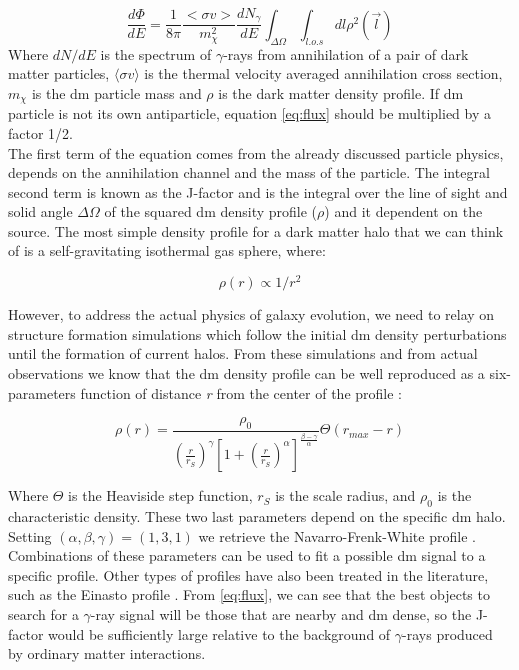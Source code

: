 \documentclass[main.tex]{subfiles}
\begin{document}
\begin{equation}
    \frac{d \Phi}{dE}=\frac{1}{8 \pi} \frac{<\sigma v>}{m_{\chi}^2} \frac{d N_{\gamma}}{dE} \int_{\Delta\Omega}\int_{l.o.s} dl \rho^2(\vec{l})
\label{eq:flux}
\end{equation}
Where $dN/dE$ is the spectrum of $\gamma$-rays from annihilation of a pair of dark matter particles, $\langle\sigma v\rangle$ is the thermal velocity averaged annihilation cross section, $m_\chi$ is the \gls{dm} particle mass and $\rho$ is the dark matter density profile. If \gls{dm} particle is not its own antiparticle, equation \ref{eq:flux} should be multiplied by a factor 1/2. \\
The first term of the equation comes from the already discussed particle physics, depends on the annihilation channel and the mass of the particle. The integral second term is known as the J-factor and is the integral over the line of sight and solid angle $\Delta\Omega$ of the squared \gls{dm} density profile ($\rho$) and it dependent on the source. The most simple density profile for a dark matter halo that we can think of is a self-gravitating isothermal gas sphere, where:

\begin{equation}
    \rho(r) \propto 1/r^2
\end{equation}

However, to address the actual physics of galaxy evolution, we need to relay on structure formation simulations which follow the initial \gls{dm} density perturbations until the formation of current halos. From these simulations and from actual observations \cite{1998Krav} we know that the \gls{dm} density profile can be well reproduced as a six-parameters function of distance \textit{r} from the center of the profile \cite{1990Hern}\cite{1996Zhao}\cite{1998Krav}:

\begin{equation}
    \rho(r) = \frac{\rho_{0}}{\left(\frac{r}{r_{S}}\right)^{\gamma}\left[ 1+\left(\frac{r}{r_{S}} \right)^{\alpha}\right]^{\frac{\beta-\gamma}{\alpha}}}\Theta(r_{max}-r)
\end{equation} \label{eq:gnfw}

Where $\Theta$ is the Heaviside step function, $r_{S}$ is the scale radius, and $\rho_{0}$ is the characteristic density. These two last parameters depend on the specific \gls{dm} halo. Setting $(\alpha,\beta,\gamma) = (1,3,1)$ we retrieve the Navarro-Frenk-White profile \cite{NFW}. Combinations of these parameters can be used to fit a possible \gls{dm} signal to a specific profile. Other types of profiles have also been treated in the literature, such as the Einasto profile \cite{1965Einasto}.
From \ref{eq:flux}, we can see that the best objects to search for a $\gamma$-ray signal will be those that are nearby and \gls{dm} dense, so the J-factor would be sufficiently large relative to the background of $\gamma$-rays produced by ordinary matter interactions. 
\end{document}
